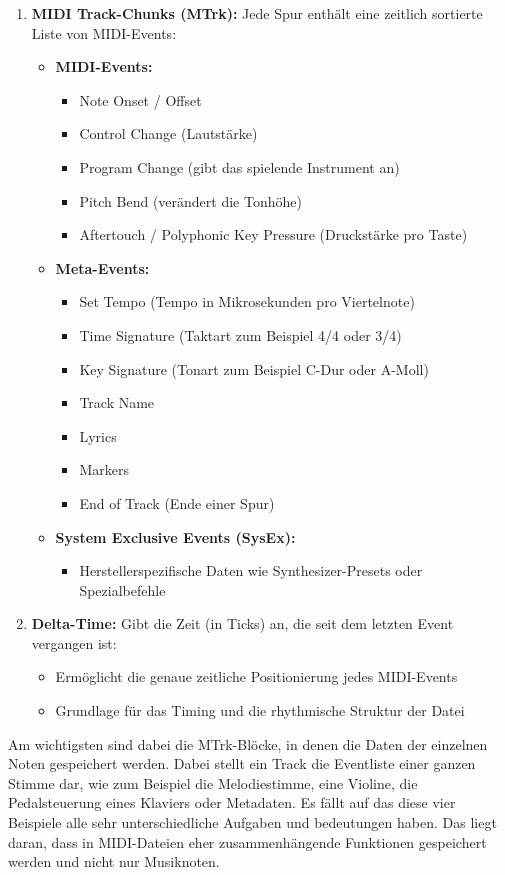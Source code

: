 \begin{description}[style=nextline]
\begin{enumerate}
    \item \textbf{MIDI Track-Chunks (MTrk):} Jede Spur enthält eine zeitlich sortierte Liste von MIDI-Events:
    \begin{itemize}
        \item \textbf{MIDI-Events:}
        \begin{itemize}
            \item Note Onset / Offset
            \item Control Change (Lautstärke)
            \item Program Change (gibt das spielende Instrument an)
            \item Pitch Bend (verändert die Tonhöhe)
            \item Aftertouch / Polyphonic Key Pressure (Druckstärke pro Taste)
        \end{itemize}
        \item \textbf{Meta-Events:}
        \begin{itemize}
            \item Set Tempo (Tempo in Mikrosekunden pro Viertelnote)
            \item Time Signature (Taktart zum Beispiel 4/4 oder 3/4)
            \item Key Signature (Tonart zum Beispiel C-Dur oder A-Moll)
            \item Track Name
            \item Lyrics
            \item Markers
            \item End of Track (Ende einer Spur)
        \end{itemize}
        \item \textbf{System Exclusive Events (SysEx):}
        \begin{itemize}
            \item Herstellerspezifische Daten wie Synthesizer-Presets oder Spezialbefehle
        \end{itemize}
    \end{itemize}

    \item \textbf{Delta-Time:} Gibt die Zeit (in Ticks) an, die seit dem letzten Event vergangen ist:
    \begin{itemize}
        \item Ermöglicht die genaue zeitliche Positionierung jedes MIDI-Events
        \item Grundlage für das Timing und die rhythmische Struktur der Datei
    \end{itemize}
\end{enumerate}
Am wichtigsten sind dabei die MTrk-Blöcke, in denen die Daten der einzelnen Noten gespeichert werden.
Dabei stellt ein Track die Eventliste einer ganzen Stimme dar,
wie zum Beispiel die Melodiestimme, eine Violine, die Pedalsteuerung eines Klaviers oder Metadaten.
Es fällt auf das diese vier Beispiele alle sehr unterschiedliche Aufgaben und bedeutungen haben.
Das liegt daran, dass in MIDI-Dateien eher zusammenhängende Funktionen gespeichert werden und nicht nur Musiknoten.


\end{description}
